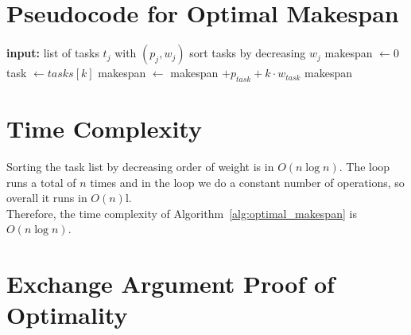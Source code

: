 \documentclass[a4paper,11pt]{article}
\begin{document}
\section{Pseudocode for Optimal Makespan}
\begin{algorithm}
\caption{Compute Optimal Makespan}
\label{alg:optimal_makespan}
\begin{algorithmic}[1]
    \State \textbf{input:} list of tasks $t_j$ with $(p_j, w_j)$
    \State sort tasks by decreasing $w_j$
    \State makespan $\gets 0$
        \State task $\gets tasks[k]$
        \State makespan $\gets $ makespan $+ p_{task} + k \cdot w_{task}$
    \EndFor
    \State \Return makespan
\end{algorithmic}
\end{algorithm}

\section{Time Complexity}
Sorting the task list by decreasing order of weight is in $O(n\log{n})$. The loop runs a total of $n$ times and in the loop we do a constant number of operations, so overall it runs in $O(n)$l.\\
Therefore, the time complexity of Algorithm~\ref{alg:optimal_makespan} is $O(n\log{n})$.

\section{Exchange Argument Proof of Optimality}
\end{document}
